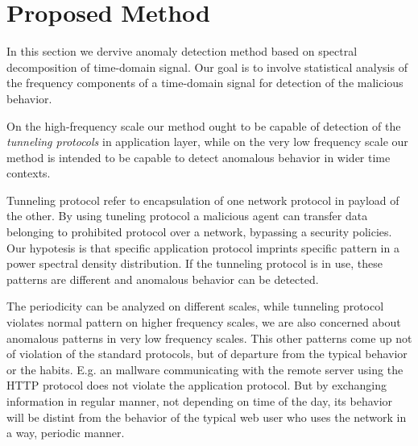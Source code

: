 
\chapter{Proposed Method}\label{ch:method}

In this section we dervive anomaly detection method based on spectral decomposition
of time-domain signal.
Our goal is to involve statistical analysis of the frequency components of a 
time-domain signal for detection of the malicious behavior.

On the high-frequency scale our method ought to be capable of detection of the
\emph{tunneling protocols} in application layer, while on the very low frequency scale
our method is intended to be capable to detect anomalous behavior in wider time contexts.

Tunneling protocol refer to encapsulation of one network 
protocol in payload of the other. By using tuneling protocol a malicious agent can 
transfer data  belonging to prohibited protocol over a network, bypassing 
a security policies. Our hypotesis is that specific application protocol imprints 
specific pattern in a power spectral density distribution. If the tunneling protocol 
is in use, these patterns are different and anomalous behavior can be detected.

The periodicity can be analyzed on different scales, while tunneling protocol
violates normal pattern on higher frequency scales, we are also concerned about anomalous
patterns in very low frequency scales. This other patterns come up not of violation 
of the standard protocols, but of departure from the typical behavior or the habits. 
E.g. an mallware communicating with the remote server using the HTTP protocol 
does not violate the application protocol. 
But by exchanging information in regular manner, not depending on time of the day,
its behavior will be distint from the behavior of the typical web user who uses the network
in a way, periodic manner.

